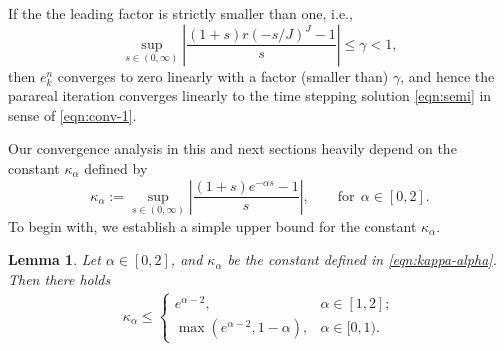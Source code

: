 \documentclass[a4paper, oneside]{book}
\newtheorem{lemma}{Lemma}[section]
\begin{document}
If the the leading factor is strictly smaller than one, i.e.,
 \begin{equation}\label{eqn:conv-factor}
   \sup_{s\in(0,\infty)} \left|\frac{(1+s) r(-s/J)^J-1}{s}\right| \le \gamma < 1,
\end{equation}
then $e_{k}^{n}$ converges to zero linearly with a factor (smaller than) $\gamma$, and hence
the parareal iteration converges linearly to the time stepping solution \eqref{eqn:semi}
in sense of \eqref{eqn:conv-1}.





Our convergence analysis in this and next sections heavily depend on the constant $\kappa_\alpha$ defined by
\begin{equation}\label{eqn:kappa-alpha}
\kappa_\alpha := \sup_{s\in(0,\infty)}\left|\frac{(1+s)e^{-\alpha s}-1 }{s}\right|,\qquad \text{for} ~~\alpha\in[0,2].
\end{equation}
To begin with, we establish a simple upper bound for the constant $\kappa_\alpha$.

\begin{lemma}\label{lem:exp}
Let $\alpha\in[0,2]$, and $\kappa_\alpha$ be the constant defined in \eqref{eqn:kappa-alpha}.
Then there holds
\begin{equation*}
\begin{split}
\kappa_\alpha \le  \begin{cases}
  e^{\alpha-2} ,\quad &\alpha\in[1,2];\\
  \max(e^{\alpha-2}, 1-\alpha),&\alpha\in[0,1).
\end{cases}
\end{split}
\end{equation*}
\end{lemma}
\end{document}
